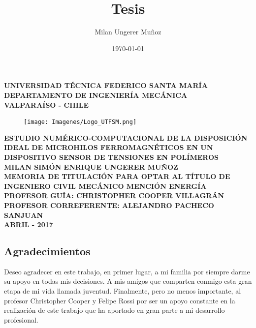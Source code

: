 \documentclass[12pt,letterpaper]{article}
\title{Tesis}
\author{Milan Ungerer Muñoz}
\date{\today}
\numberwithin{equation}{section}
\begin{document}
\begin{titlepage}
	
	\begin{center}
		\vspace*{-1in}
		
		\Large \textbf{UNIVERSIDAD TÉCNICA FEDERICO SANTA MARÍA}\\
		\vspace*{0.15in}
		\large \textbf{DEPARTAMENTO DE INGENIERÍA MECÁNICA} \\
		\vspace*{0.15in}
		\textbf{VALPARAÍSO - CHILE}
		
		\begin{figure}[h!]
			\centering\texttt{[image: Imagenes/Logo\_UTFSM.png]}
		\end{figure}
		\vspace*{0.15in}
		\Large \textbf{ESTUDIO NUMÉRICO-COMPUTACIONAL DE LA DISPOSICIÓN IDEAL DE MICROHILOS FERROMAGNÉTICOS EN UN DISPOSITIVO SENSOR DE TENSIONES EN POLÍMEROS}\\
		\vspace*{1in}
		\large\centering \textbf{MILAN SIMÓN ENRIQUE UNGERER MUÑOZ}\\
		\vspace*{0.15in}
		\centering\normalsize \textbf{MEMORIA DE TITULACIÓN PARA OPTAR AL TÍTULO DE INGENIERO CIVIL MECÁNICO MENCIÓN ENERGÍA}\\
		\vspace*{0.6in}
		\centering\normalsize \textbf{PROFESOR GUÍA: \hspace{2.5cm} CHRISTOPHER COOPER VILLAGRÁN}\\
		\vspace*{0.15in}
		\centering\normalsize \textbf{PROFESOR CORREFERENTE: \hspace{1cm} ALEJANDRO PACHECO SANJUAN}\\
		\vspace*{1in}
		\centering\normalsize \textbf{ABRIL - 2017}\\
	\end{center}
	
\end{titlepage}
\newpage\null\thispagestyle{empty}\newpage

\begin{center}
	\section*{Agradecimientos}

	Deseo agradecer en este trabajo, en primer lugar, a mi familia por siempre darme su apoyo en todas mis decisiones. A mis amigos que comparten conmigo esta gran etapa de mi vida llamada juventud. Finalmente, pero no menos importante, al profesor Christopher Cooper y Felipe Rossi por ser un apoyo constante en la realización de este trabajo que ha aportado en gran parte a mi desarrollo profesional.

\end{center}
\end{document}
